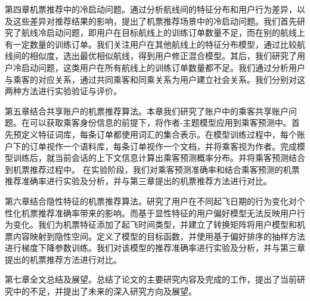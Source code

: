 第四章机票推荐中的冷启动问题。通过分析航线间的特征分布和用户行为差异，以及这些差异对推荐结果的影响，提出了机票推荐场景中的冷启动问题。我们首先研究了航线冷启动问题，即用户在目标航线上的训练订单数量不足，而在别的航线上有一定数量的训练订单。我们关注用户在其他航线上的特征分布模型，通过比较航线间的相似度，选出最优相似航线，得到用户修正混合模型。其后，我们研究了用户冷启动问题，这类用户在所有航线上的训练订单数量都不足。我们通过分析用户与乘客的对应关系，通过共同乘客和同乘关系为用户建立社会关系。我们分别对这两种方法进行实验验证与评价。

第五章结合共享账户的机票推荐算法。本章我们研究了账户中的乘客共享账户问题。在可以获取乘客身份信息的前提下，将作者-主题模型应用到乘客预测中。首先预定义特征词库，每条订单都使用词汇的集合表示。在模型训练过程中，每个账户下的订单视作一个语料库，每条订单视作一个文档，并将乘客视为作者。完成模型训练后，就当前会话的上下文信息计算出乘客预测概率分布。并将乘客预测结合到机票推荐过程中。
在实验阶段，我们对乘客预测准确率和结合乘客预测的机票推荐准确率进行实验及分析，并与第三章提出的机票推荐方法进行对比。

第六章结合隐性特征的机票推荐算法。研究了用户在不同起飞日期的行为变化对个性化机票推荐准确率带来的影响。而基于显性特征的用户偏好模型无法反映用户行为变化。我们为机票特征添加了起飞时间类型，并建立了转换矩阵将用户模型和机票内容映射到隐性空间。定义了模型的目标函数，并使用基于偏好排序的抽样方法进行梯度下降参数训练。我们对该模型的推荐准确率进行实验及分析，并与第三章提出的机票推荐方法进行对比。

第七章全文总结及展望。总结了论文的主要研究内容及完成的工作，提出了当前研究中的不足，并提出了未来的深入研究方向及展望。